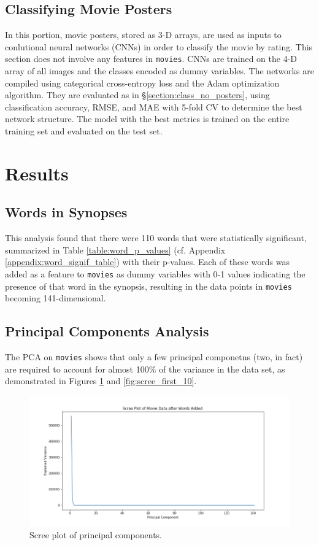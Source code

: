 \documentclass[12pt, oneside]{article}   	%
\begin{document}
\subsection{Classifying Movie Posters}
\label{section:class_posters}

In this portion, movie posters, stored as 3-D arrays, are used as inputs to conlutional neural networks (CNNs) in order to classify the movie by rating. This section does not involve any features in \texttt{movies}. CNNs are trained on the 4-D array of all images and the classes encoded as dummy variables. The networks are compiled using categorical cross-entropy loss and the Adam optimization algorithm. They are evaluated as in \S \ref{section:class_no_posters}, using classification accuracy, RMSE, and MAE with 5-fold CV to determine the best network structure. The model with the best metrics is trained on the entire training set and evaluated on the test set.

\section{Results}

\subsection{Words in Synopses}
\label{section:words_results}

This analysis found that there were 110 words that were statistically significant, summarized in Table \ref{table:word_p_values} (cf. Appendix \ref{appendix:word_signif_table}) with their p-values. Each of these words was added as a feature to \texttt{movies} as dummy variables with 0-1 values indicating the presence of that word in the synopsis, resulting in the data points in \texttt{movies} becoming 141-dimensional.

\subsection{Principal Components Analysis}
\label{section:pca_results}

The PCA on \texttt{movies} shows that only a few principal componetns (two, in fact) are required to account for almost 100\% of the variance in the data set, as demonstrated in Figures \ref{fig:scree_whole} and \ref{fig:scree_first_10}.

\begin{figure}%
\includegraphics[width=\textwidth]{scree_whole}
\caption{\label{fig:scree_whole}Scree plot of principal components.}
\end{figure}
\end{document}
